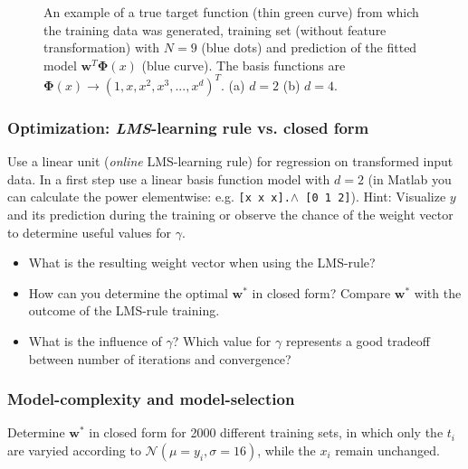 \documentclass[a4]{article}
\begin{document}
\begin{figure}[!h]
\begin{center}
\centering
\end{center}
\caption{An example of a true target function (thin green curve) from which the training data was generated, training set (without feature transformation) with $N=9$ (blue dots) and prediction of the fitted model ${\mathbf w}^T{\mathbf \Phi}(x)$ (blue curve). The basis functions are ${\mathbf \Phi}(x) \rightarrow (1,x,x^2,x^3,...,x^d)^T$. (a) $d=2$ (b) $d=4$.}
\end{figure}

\subsubsection{Optimization: \emph{LMS}-learning rule vs. closed form}

Use a linear unit (\emph{online} LMS-learning rule) for regression on transformed input data. In a first step use a linear basis function model with $d=2$ (in Matlab you can calculate the power elementwise: e.g. \texttt{[x x x].$\wedge$ [0 1 2]}). Hint: Visualize $y$ and its prediction during the training or observe the chance of the weight vector to determine useful values for $\gamma$.
\vspace{2mm}

\begin{itemize}
\item What is the resulting weight vector when using the LMS-rule?
\item How can you determine the optimal ${\mathbf w}^*$ in closed form? Compare ${\mathbf w}^*$ with the outcome of the LMS-rule training.
\item What is the influence of $\gamma$? Which value for $\gamma$ represents a good tradeoff between number of iterations and convergence? 
\end{itemize}

\subsubsection{Model-complexity and model-selection}
Determine ${\mathbf w}^*$ in closed form for 2000 different training sets, in which only the $t_i$ are varyied according to $\mathcal{N}(\mu = y_i,\sigma = 16)$, while the $x_i$ remain unchanged. 
\end{document}
